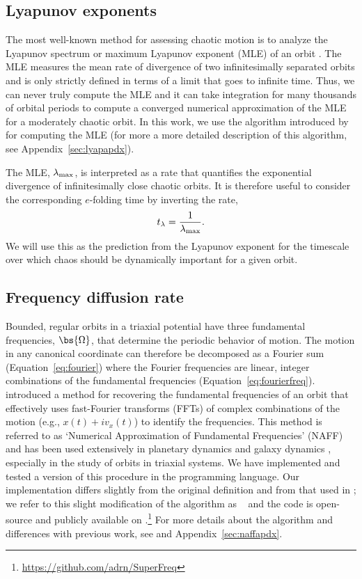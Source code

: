 \subsection{Lyapunov exponents} \label{sec:lyap}

The most well-known method for assessing chaotic motion is to analyze the Lyapunov spectrum or maximum Lyapunov exponent (MLE) of an orbit \citep{lyapunov92}. The MLE measures the mean rate of divergence of two infinitesimally separated orbits and is only strictly defined in terms of a limit that goes to infinite time. Thus, we can never truly compute the MLE and it can take integration for many thousands of orbital periods to compute a converged numerical approximation of the MLE for a moderately chaotic orbit. In this work, we use the algorithm introduced by \cite{wolf85} for computing the MLE (for more a more detailed description of this algorithm, see Appendix~\ref{sec:lyapapdx}).

The MLE, $\lambda_{\rm max}$, is interpreted as a rate that quantifies the exponential divergence of infinitesimally close chaotic orbits. It is therefore useful to consider the corresponding $e$-folding time by inverting the rate,
\begin{equation}
	t_{\rm \lambda} = \frac{1}{\lambda_{\rm max}}.
\end{equation}
We will use this as the prediction from the Lyapunov exponent for the timescale over which chaos should be dynamically important for a given orbit. 

\subsection{Frequency diffusion rate}\label{sec:naff}

Bounded, regular orbits in a triaxial potential have three fundamental frequencies, $\bs{\Omega}$, that determine the periodic behavior of motion. The motion in any canonical coordinate can therefore be decomposed as a Fourier sum (Equation~\ref{eq:fourier}) where the Fourier frequencies are linear, integer combinations of the fundamental frequencies (Equation~\ref{eq:fourierfreq}). \cite{laskar93} introduced a method for recovering the fundamental frequencies of an orbit that effectively uses fast-Fourier transforms (FFTs) of complex combinations of the motion (e.g., $x(t) + i v_x(t)$) to identify the frequencies. This method is referred to as `Numerical Approximation of Fundamental Frequencies' (NAFF) and has been used extensively in planetary dynamics \citep[e.g.,][]{laskar93b, laskar96} and galaxy dynamics \citep{papaphilippou98, valluri98}, especially in the study of orbits in triaxial systems. We have implemented and tested a version of this procedure in the  programming language. Our implementation differs slightly from the original definition and from that used in \cite{valluri98}; we refer to this slight modification of the algorithm as \superfreq\ \citep{superfreq} and the code is open-source and publicly available on .\footnote{\url{https://github.com/adrn/SuperFreq}} For more details about the algorithm and differences with previous work, see \cite{laskar88, laskar93, papaphilippou96} and Appendix~\ref{sec:naffapdx}. 

